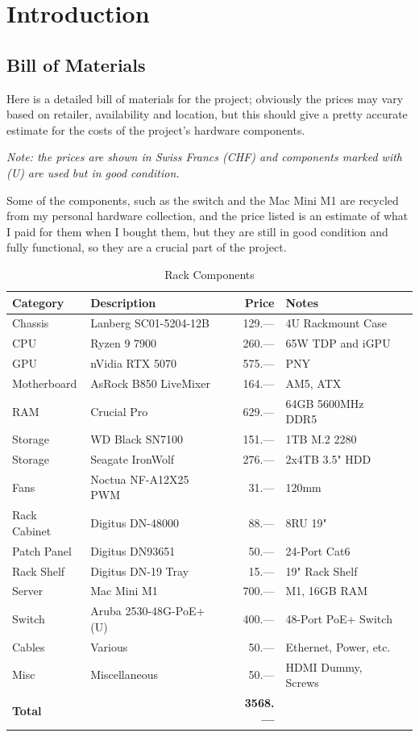 \documentclass[a4paper, 11pt, twoside]{report}
\begin{document}
\chapter{Introduction}

\section{Bill of Materials}

Here is a detailed bill of materials for the project; obviously the prices may vary based on retailer, availability and 
location, but this should give a pretty accurate estimate for the costs of the project's hardware components.

\textit{Note: the prices are shown in Swiss Francs (CHF) and components marked with (U) are used but in good condition.}

Some of the components, such as the switch and the Mac Mini M1 are recycled from my personal hardware collection, 
and the price listed is an estimate of what I paid for them when I bought them, but they are still in good condition and
fully functional, so they are a crucial part of the project.

\begin{table}[h]
\centering
\begin{tabular}{@{}lp{6cm}rp{4cm}l@{}}
\toprule
\textbf{Category} & \textbf{Description} & \textbf{Price} & \textbf{Notes} \\ \midrule
Chassis      & Lanberg SC01-5204-12B   & 129.— & 4U Rackmount Case\\
CPU          & Ryzen 9 7900            & 260.— & 65W TDP and iGPU\\
GPU          & nVidia RTX 5070         & 575.— & PNY\\
Motherboard  & AsRock B850 LiveMixer   & 164.— & AM5, ATX\\
RAM          & Crucial Pro             & 629.— & 64GB 5600MHz DDR5\\
Storage      & WD Black SN7100         & 151.— & 1TB M.2 2280\\
Storage      & Seagate IronWolf        & 276.— & 2x4TB 3.5" HDD\\
Fans         & Noctua NF-A12X25 PWM    &  31.— & 120mm\\
Rack Cabinet & Digitus DN-48000        &  88.— & 8RU 19"\\
Patch Panel  & Digitus DN93651         &  50.— & 24-Port Cat6\\
Rack Shelf   & Digitus DN-19 Tray      &  15.— & 19" Rack Shelf\\
Server       & Mac Mini M1             & 700.— & M1, 16GB RAM\\
Switch       & Aruba 2530-48G-PoE+ (U) & 400.— & 48-Port PoE+ Switch\\
Cables       & Various                 &  50.— & Ethernet, Power, etc.\\
Misc         & Miscellaneous           &  50.— & HDMI Dummy, Screws\\
\midrule
\textbf{Total} &  & \textbf{3568.—} & \\
\bottomrule
\end{tabular}
    \caption{Rack Components \cite{galaxus}}
\end{table}
\end{document}
